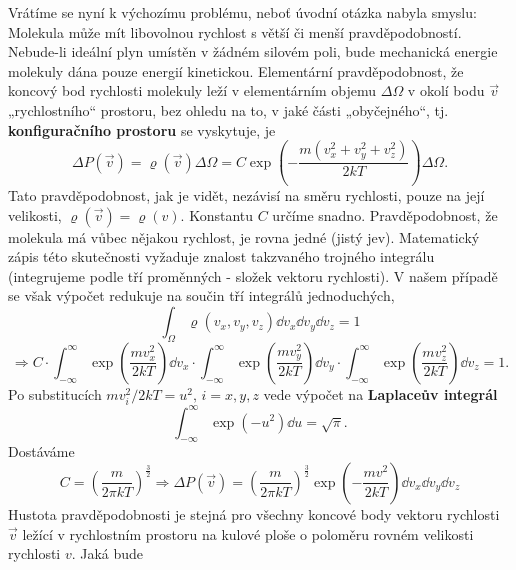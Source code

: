 \begin{example}
  Vrátíme se nyní k výchozímu problému, neboť úvodní otázka nabyla smyslu: Molekula může mít 
  libovolnou rychlost s větší či menší pravděpodobností. Nebude-li ideální plyn umístěn v žádném 
  silovém poli, bude mechanická energie molekuly dána pouze energií kinetickou. Elementární 
  pravděpodobnost, že koncový bod rychlosti molekuly leží v elementárním objemu \(\Delta\Omega\) v 
  okolí bodu \(\vec{v}\) „rychlostního“ prostoru, bez ohledu na to, v jaké části „obyčejného“, tj. 
  \textbf{konfiguračního prostoru} se vyskytuje, je
  \begin{equation*}
    \Delta P(\vec{v}) = \varrho(\vec{v})\Delta\Omega 
                      = C\exp\left(-\dfrac{m(v_x^2 + v_y^2 + v_z^2)}{2kT}\right)\Delta\Omega.
  \end{equation*}
  Tato pravděpodobnost, jak je vidět, nezávisí na směru rychlosti, pouze na její velikosti, 
  \(\varrho(\vec{v}) = \varrho(v)\). Konstantu \(C\) určíme snadno. Pravděpodobnost, že molekula má 
  vůbec nějakou rychlost, je rovna jedné (jistý jev). Matematický zápis této skutečnosti vyžaduje 
  znalost takzvaného trojného integrálu (integrujeme podle tří proměnných  - složek vektoru 
  rychlosti). V našem případě se však výpočet redukuje na součin tří integrálů jednoduchých,
  \begin{equation*}
    \int_{\Omega}\varrho(v_x, v_y, v_z)\dd{v_x}\dd{v_y}\dd{v_z} = 1
  \end{equation*}
  \begin{equation*}
    \Rightarrow C \cdot
     \int_{-\infty}^{\infty}\exp\left(\dfrac{mv_x^2}{2kT}\right)\dd{v_x} \cdot
     \int_{-\infty}^{\infty}\exp\left(\dfrac{mv_y^2}{2kT}\right)\dd{v_y} \cdot
     \int_{-\infty}^{\infty}\exp\left(\dfrac{mv_z^2}{2kT}\right)\dd{v_z} =1.
  \end{equation*}
  Po substitucích \(mv_i^2/2kT = u^2,\, i = x, y, z\) vede výpočet na \textbf{Laplaceův integrál}
  \begin{equation*}
    \int_{-\infty}^{\infty}\exp(-u^2)\dd{u} = \sqrt{\pi}.
  \end{equation*}
  Dostáváme
  \begin{equation*}
    C = \left(\dfrac{m}{2\pi kT}\right)^{\frac{3}{2}} \Rightarrow
    \Delta P(\vec{v}) = \left(\dfrac{m}{2\pi kT}\right)^{\frac{3}{2}}
                        \exp\left(- \dfrac{mv^2}{2 kT}\right)\dd{v_x}\dd{v_y}\dd{v_z}
  \end{equation*}
  Hustota pravděpodobnosti je stejná pro všechny koncové body vektoru rychlosti \(\vec{v}\) ležící 
  v rychlostním prostoru na kulové ploše o poloměru rovném velikosti rychlosti \(v\). Jaká bude 

\end{example}
